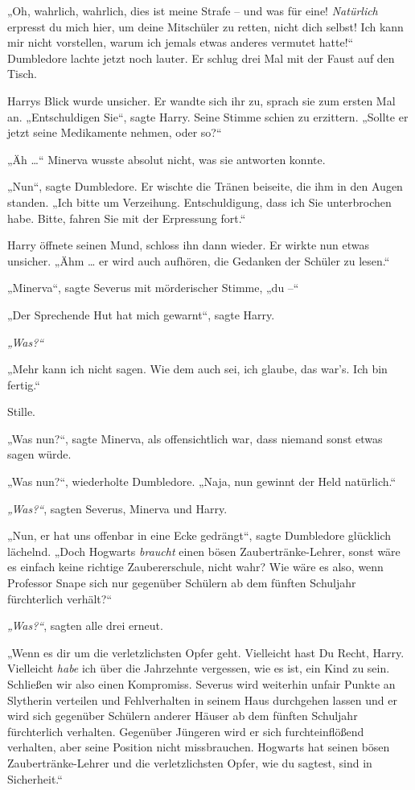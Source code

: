 {„Oh, wahrlich, wahrlich, dies ist meine Strafe -- und was für eine! \emph{Natürlich} erpresst du mich hier, um deine Mitschüler zu retten, nicht dich selbst! Ich kann mir nicht vorstellen, warum ich jemals etwas anderes vermutet hatte!“ Dumbledore lachte jetzt noch lauter. Er schlug drei Mal mit der Faust auf den Tisch.

Harrys Blick wurde unsicher. Er wandte sich ihr zu, sprach sie zum ersten Mal an. „Entschuldigen Sie“, sagte Harry. Seine Stimme schien zu erzittern. „Sollte er jetzt seine Medikamente nehmen, oder so?“

„Äh …“ Minerva wusste absolut nicht, was sie antworten konnte.

„Nun“, sagte Dumbledore. Er wischte die Tränen beiseite, die ihm in den Augen standen. „Ich bitte um Verzeihung. Entschuldigung, dass ich Sie unterbrochen habe. Bitte, fahren Sie mit der Erpressung fort.“

Harry öffnete seinen Mund, schloss ihn dann wieder. Er wirkte nun etwas unsicher. „Ähm … er wird auch aufhören, die Gedanken der Schüler zu lesen.“

„Minerva“, sagte Severus mit mörderischer Stimme, „du --“

„Der Sprechende Hut hat mich gewarnt“, sagte Harry.

\emph{„Was?“}

„Mehr kann ich nicht sagen. Wie dem auch sei, ich glaube, das war's. Ich bin fertig.“

Stille.

„Was nun?“, sagte Minerva, als offensichtlich war, dass niemand sonst etwas sagen würde.

„Was nun?“, wiederholte Dumbledore. „Naja, nun gewinnt der Held natürlich.“

\emph{„Was?“}, sagten Severus, Minerva und Harry.

„Nun, er hat uns offenbar in eine Ecke gedrängt“, sagte Dumbledore glücklich lächelnd. „Doch Hogwarts \emph{braucht} einen bösen Zaubertränke-Lehrer, sonst wäre es einfach keine richtige Zaubererschule, nicht wahr? Wie wäre es also, wenn Professor Snape sich nur gegenüber Schülern ab dem fünften Schuljahr fürchterlich verhält?“

\emph{„Was?“}, sagten alle drei erneut.

„Wenn es dir um die verletzlichsten Opfer geht. Vielleicht hast Du Recht, Harry. Vielleicht \emph{habe} ich über die Jahrzehnte vergessen, wie es ist, ein Kind zu sein. Schließen wir also einen Kompromiss. Severus wird weiterhin unfair Punkte an Slytherin verteilen und Fehlverhalten in seinem Haus durchgehen lassen und er wird sich gegenüber Schülern anderer Häuser ab dem fünften Schuljahr fürchterlich verhalten. Gegenüber Jüngeren wird er sich furchteinflößend verhalten, aber seine Position nicht missbrauchen. Hogwarts hat seinen bösen Zaubertränke-Lehrer und die verletzlichsten Opfer, wie du sagtest, sind in Sicherheit.“

}
